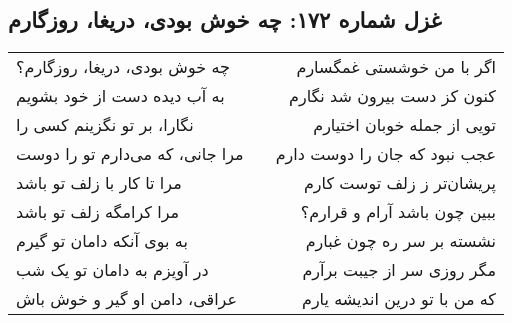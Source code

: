 \begin{center}
\section*{غزل شماره ۱۷۲: چه خوش بودی، دریغا، روزگارم}
\label{sec:172}
\begin{longtable}{l p{0.5cm} r}
چه خوش بودی، دریغا، روزگارم؟
&&
اگر با من خوشستی غمگسارم
\\
به آب دیده دست از خود بشویم
&&
کنون کز دست بیرون شد نگارم
\\
نگارا، بر تو نگزینم کسی را
&&
تویی از جمله خوبان اختیارم
\\
مرا جانی، که می‌دارم تو را دوست
&&
عجب نبود که جان را دوست دارم
\\
مرا تا کار با زلف تو باشد
&&
پریشان‌تر ز زلف توست کارم
\\
مرا کرامگه زلف تو باشد
&&
ببین چون باشد آرام و قرارم؟
\\
به بوی آنکه دامان تو گیرم
&&
نشسته بر سر ره چون غبارم
\\
در آویزم به دامان تو یک شب
&&
مگر روزی سر از جیبت برآرم
\\
عراقی، دامن او گیر و خوش باش
&&
که من با تو درین اندیشه یارم
\\
\end{longtable}
\end{center}
